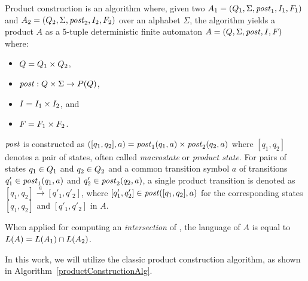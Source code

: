 \begin{definition} \hfill \newline
Product construction is an algorithm where, given two \nfas $A_1 = (Q_1, \Sigma, \mathit{post}_1, I_1, F_1)$ and $A_2 = (Q_2, \Sigma, \mathit{post}_2, I_2, F_2)$ over an alphabet $\Sigma$, the algorithm yields a product \nfa $A$ as a 5-tuple deterministic finite automaton $A = (Q, \Sigma, \mathit{post}, I, F)$ where:
\begin{itemize}
    \item $Q = Q_1 \times Q_2$,
    \item $\mathit{post}: Q \times \Sigma \rightarrow{} P(Q)$,
    \item $I = I_1 \times I_2$, and
    \item $F = F_1 \times F_2$.
\end{itemize}
\end{definition}

$\mathit{post}$ is constructed as $([q_1, q_2], a) = \mathit{post}_1(q_1, a) \times \mathit{post}_2(q_2, a)$ where $[q_1, q_2]$ denotes a pair of states, often called \emph{macrostate} or \emph{product state}. For pairs of states $q_1 \in Q_1$ and $q_2 \in Q_2$ and a common transition symbol $a$ of transitions $q'_1 \in \mathit{post}_1(q_1, a)$ and $q'_2 \in \mathit{post}_2(q_2,a)$, a single product transition is denoted as $[q_1, q_2] \xrightarrow{a} [q'_1, q'_2]$, where $[q'_1, q'_2] \in \mathit{post}([q_1, q_2], a)$ for the corresponding states $[q_1, q_2]$ and $[q'_1, q'_2]$ in $A$.

When applied for computing an \emph{intersection} of \nfas, the language of $A$ is equal to $ L(A) = L(A_1) \cap L(A_2) $.

In this work, we will utilize the classic product construction algorithm, as shown in Algorithm~\ref{productConstructionAlg}.

